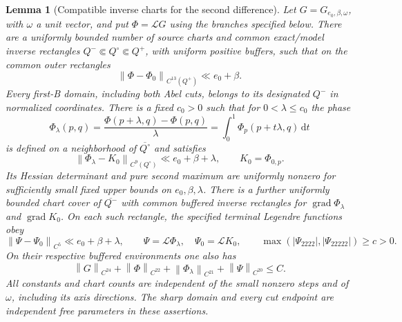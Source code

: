 \documentclass[11pt,a4paper]{article}
\numberwithin{equation}{section}
\newtheorem{lemma}[theorem]{Lemma}
\theoremstyle{remark}
\newcommand{\dd}{\,\mathrm d}
\newcommand{\norm}[1]{\left\lVert #1\right\rVert}
\DeclareMathOperator{\grad}{grad}
\newcommand{\Leg}{\mathcal L}
\begin{document}
\begin{lemma}[Compatible inverse charts for the second difference]
\label{lem:transfer}
Let $G=G_{e_0,\beta,\omega}$, with $\omega$ a unit vector, and put
$\Phi=\Leg G$ using the branches specified below. There are a uniformly
bounded number of source charts and common exact/model inverse rectangles
$Q^-\Subset Q^\circ\Subset Q^+$, with uniform positive buffers, such
that on the common outer rectangles
\[
 \norm{\Phi-\Phi_0}_{C^{13}(Q^+)}\ll e_0+\beta.
\]
Every first-B domain, including both Abel cuts, belongs to its designated
$Q^-$ in normalized coordinates. There is a fixed $c_0>0$ such that for
$0<\lambda\le c_0$ the phase
\begin{equation}\label{eq:Phi-lambda}
 \Phi_\lambda(p,q)
 =\frac{\Phi(p+\lambda,q)-\Phi(p,q)}\lambda
 =\int_0^1\Phi_p(p+t\lambda,q)\dd t
\end{equation}
is defined on a neighborhood of $\overline{Q^\circ}$ and satisfies
\begin{equation}\label{eq:Phi-lambda-close}
 \norm{\Phi_\lambda-K_0}_{C^9(Q^\circ)}
 \ll e_0+\beta+\lambda,
 \qquad K_0=\Phi_{0,p}.
\end{equation}
Its Hessian determinant and pure second maximum are uniformly nonzero
for sufficiently small fixed upper bounds on $e_0,\beta,\lambda$.
There is a further uniformly bounded chart cover of $\overline{Q^-}$
with common buffered inverse rectangles for
$\grad\Phi_\lambda$ and $\grad K_0$. On each such rectangle, the specified
terminal Legendre functions obey
\[
 \norm{\Psi-\Psi_0}_{C^5}\ll e_0+\beta+\lambda,
 \qquad \Psi=\Leg\Phi_\lambda,\quad\Psi_0=\Leg K_0,
 \qquad \max(|\Psi_{2222}|,|\Psi_{22222}|)\ge c>0.
\]
On their respective buffered environments one also has
\begin{equation}\label{eq:uniform-high-regularity}
 \norm{G}_{C^{24}}+\norm{\Phi}_{C^{22}}
       +\norm{\Phi_\lambda}_{C^{21}}+\norm{\Psi}_{C^{20}}\le C.
\end{equation}
All constants and chart counts are independent of the small nonzero
steps and of $\omega$, including its axis directions. The sharp domain
and every cut endpoint are independent free parameters in these assertions.
\end{lemma}
\end{document}
